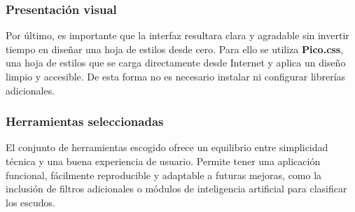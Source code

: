 \subsubsection{Presentación visual}
Por último, es importante que la interfaz resultara clara y agradable sin invertir tiempo 
en diseñar una hoja de estilos desde cero.  
Para ello se utiliza \textbf{Pico.css}, una hoja de estilos que se carga directamente desde Internet y aplica un diseño 
limpio y accesible. De esta forma no es necesario instalar ni configurar librerías adicionales.

\subsubsection{Herramientas seleccionadas}
El conjunto de herramientas escogido ofrece un equilibrio entre simplicidad técnica y una buena experiencia de usuario. 
Permite tener una aplicación funcional, fácilmente reproducible y adaptable a futuras mejoras, como la inclusión de 
filtros adicionales o módulos de inteligencia artificial para clasificar los escudos.